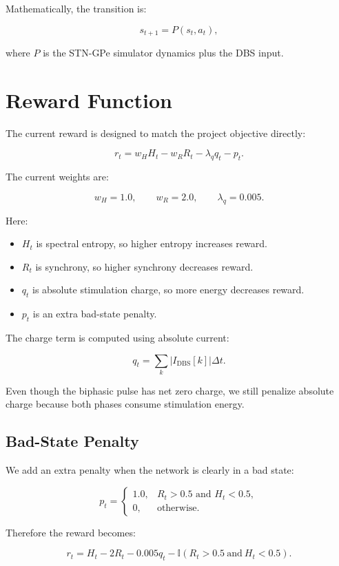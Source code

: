 \documentclass[11pt]{article}
\begin{document}
Mathematically, the transition is:

\[
s_{t+1} = P(s_t, a_t),
\]

where \(P\) is the STN-GPe simulator dynamics plus the DBS input.

\section{Reward Function}

The current reward is designed to match the project objective directly:

\[
r_t = w_H H_t - w_R R_t - \lambda_q q_t - p_t.
\]

The current weights are:

\[
w_H = 1.0, \qquad w_R = 2.0, \qquad \lambda_q = 0.005.
\]

Here:

\begin{itemize}[nosep]
    \item \(H_t\) is spectral entropy, so higher entropy increases reward.
    \item \(R_t\) is synchrony, so higher synchrony decreases reward.
    \item \(q_t\) is absolute stimulation charge, so more energy decreases
    reward.
    \item \(p_t\) is an extra bad-state penalty.
\end{itemize}

The charge term is computed using absolute current:

\[
q_t = \sum_k |I_{\text{DBS}}[k]| \Delta t.
\]

Even though the biphasic pulse has net zero charge, we still penalize absolute
charge because both phases consume stimulation energy.

\subsection{Bad-State Penalty}

We add an extra penalty when the network is clearly in a bad state:

\[
p_t =
\begin{cases}
1.0, & R_t > 0.5 \text{ and } H_t < 0.5, \\
0, & \text{otherwise}.
\end{cases}
\]

Therefore the reward becomes:

\[
r_t =
H_t - 2R_t - 0.005q_t
- \mathbb{I}(R_t > 0.5 \ \text{and}\ H_t < 0.5).
\]
\end{document}
